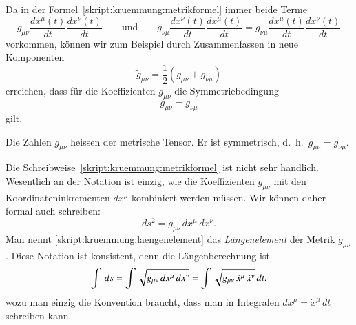 Da in der Formel~\eqref{skript:kruemmung:metrikformel} immer beide Terme
\[
g_{\mu\nu} \frac{dx^\mu(t)}{dt} \frac{dx^\nu(t)}{dt}
\qquad\text{und}\qquad
g_{\nu\mu} \frac{dx^\nu(t)}{dt} \frac{dx^\mu(t)}{dt}
=
g_{\nu\mu} \frac{dx^\mu(t)}{dt} \frac{dx^\nu(t)}{dt}
\]
vorkommen, können wir zum Beispiel durch Zusammenfassen in neue Komponenten
\[
\tilde g_{\mu\nu} = \frac12(g_{\mu\nu}+g_{\nu\mu})
\]
erreichen, dass für die Koeffizienten $g_{\mu\nu}$ die Symmetriebedingung
\[
g_{\mu\nu}=g_{\nu\mu}
\]
gilt.

\begin{definition}
Die Zahlen $g_{\mu\nu}$ heissen der metrische Tensor.
Er ist symmetrisch, d.~h.~$g_{\mu\nu}=g_{\nu\mu}$.
%
%
%
%
\end{definition}

Die Schreibweise~\eqref{skript:kruemmung:metrikformel} ist nicht
sehr handlich.
Wesentlich an der Notation ist einzig, wie die Koeffizienten $g_{\mu\nu}$
mit den Koordinateninkrementen $dx^\mu$ kombiniert werden müssen.
Wir können daher formal auch schreiben:
\begin{equation}
ds^2
=
g_{\mu\nu}\,dx^\mu\,dx^\nu.
\label{skript:kruemmung:laengenelement}
\end{equation}
Man nennt \eqref{skript:kruemmung:laengenelement} das {\em Längenelement}
der Metrik $g_{\mu\nu}$.
%
Diese Notation ist konsistent, denn die Längen\-berechnung ist
\begin{equation}
\int\,ds
=
\int \sqrt{g_{\mu\nu}\,dx^\mu\,dx^\nu}
=
\int \sqrt{\mathstrut g_{\mu\nu}\,\dot x^\mu\,\dot x^\nu}\,dt,
\label{skript:kruemmung:laengenformel}
\end{equation}
wozu man einzig die Konvention braucht, dass man in Integralen
$dx^\mu=\dot x^\mu\,dt$ schreiben kann.

